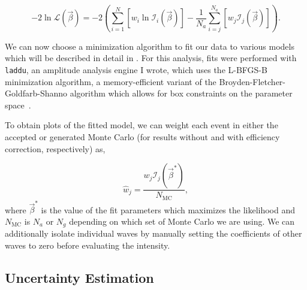 \begin{equation}
  -2\ln\mathcal{L}(\vec{\beta}) = -2\left(\sum_{i=1}^N\left[w_i\ln\mathcal{I}_i(\vec{\beta})\right] - \frac{1}{N_a} \sum_{i=j}^{N_a}\left[w_j\mathcal{I}_j(\vec{\beta})\right]\right).
\end{equation}

We can now choose a minimization algorithm to fit our data to various models which will be described in detail in . For this analysis, fits were performed with \texttt{laddu}, an amplitude analysis engine I wrote, which uses the L-BFGS-B minimization algorithm, a memory-efficient variant of the Broyden-Fletcher-Goldfarb-Shanno algorithm which allows for box constraints on the parameter space~\cite{Byrd1995}.

To obtain plots of the fitted model, we can weight each event in either the accepted or generated Monte Carlo (for results without and with efficiency correction, respectively) as,

\begin{equation}
  \hat{w}_j = \frac{w_j \mathcal{I}_j(\vec{\beta}^*)}{N_\text{MC}},
\end{equation}
where $\vec{\beta}^*$ is the value of the fit parameters which maximizes the likelihood and $N_\text{MC}$ is $N_a$ or $N_g$ depending on which set of Monte Carlo we are using. We can additionally isolate individual waves by manually setting the coefficients of other waves to zero before evaluating the intensity.

\subsection{Uncertainty Estimation}


